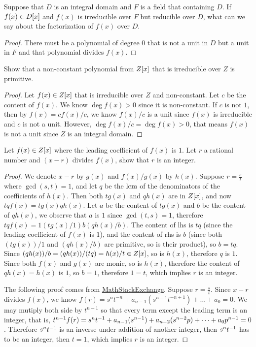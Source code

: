 \documentclass[../main.tex]{subfiles}
\begin{document}
\begin{exercise}
  Suppose that $D$ is an integral domain and $F$ is a field that containing $D$.
  If $f(x) \in D[x]$ and $f(x)$ is irreducible over $F$
  but reducible over $D$, what can we say about the factorization of $f(x)$ over $D$.
\end{exercise}
\begin{proof}
  There must be a polynomial of degree $0$ that is not a unit in $D$
  but a unit in $F$ and that polynomial divides $f(x)$.
\end{proof}

\setcounter{exercise}{2}
\begin{exercise}
  Show that a non-constant polynomial from $Z[x]$ that is irreducible
  over $Z$ is primitive.
\end{exercise}
\begin{proof}
  Let $f(x) \in Z[x]$ that is irreducible over $Z$ and non-constant.
  Let $c$ be the content of $f(x)$.
  We know $\deg f(x) > 0$ since it is non-constant.
  If $c$ is not $1$, then by $f(x) = cf(x)/c$, we know $f(x)/c$ is a unit
  since $f(x)$ is irreducible and $c$ is not a unit. 
  However, $\deg f(x)/c = \deg f(x) > 0$, that means $f(x)$ is not a unit
  since $Z$ is an integral domain.
\end{proof}

\begin{exercise}
  Let $f(x) \in Z[x]$ where the leading coefficient of $f(x)$ is $1$.
  Let $r$ a rational number and $(x - r)$ divides $f(x)$, 
  show that $r$ is an integer.
\end{exercise}
\begin{proof}
  We denote $x - r$ by $g(x)$ and $f(x)/g(x)$ by $h(x)$.
  Suppose $r = \frac{s}{t}$ where $\gcd(s, t) = 1$,
  and let $q$ be the $\operatorname{lcm}$ of the denominators of the coefficients of $h(x)$.
  Then both $tg(x)$ and $qh(x)$ are in $Z[x]$, and now $tqf(x) = tg(x)qh(x)$.
  Let $a$ be the content of $tg(x)$ and $b$ be the content of $qh(x)$,
  we observe that $a$ is $1$ since $\gcd(t, s) = 1$, therefore 
  $tqf(x) = 1(tg(x)/1) b(qh(x)/b)$.
  The content of lhs is $tq$ (since the leading coefficient of $f(x)$ is $1$),
  and the content of rhs is $b$ (since both $(tg(x))/1$ and $(qh(x)/b)$ are primitive,
  so is their product), so $b = tq$.
  Since $(qh(x))/b = (qh(x))/(tq) = h(x)/t \in Z[x]$, so is $h(x)$, therefore $q$ is $1$.
  Since both $f(x)$ and $g(x)$ are monic, so is $h(x)$, therefore the content of
  $qh(x) = h(x)$ is $1$, so $b = 1$, therefore $1 = t$, which implies $r$ is an integer.

  The following proof comes from \href{https://math.stackexchange.com/a/3330480}{MathStackExchange}.
  Suppose $r = \frac{s}{t}$.
  Since $x - r$ divides $f(x)$, we know $f(r) = s^nt^{-n} + a_{n - 1}(s^{n - 1}t^{- n + 1}) + \dots + a_0 = 0$.
  We may mutiply both side by $t^{n - 1}$ so that every term except the leading term
  is an integer, that is, $t^{n - 1}f(r) = s^nt^{-1} + a_{n - 1}(s^{n - 1}) + a_{n - 2}(s^{n - 2}p) + \dots + a_0p^{n - 1} = 0$.
  Therefore $s^nt^{-1}$ is an inverse under addition of another integer, 
  then $s^nt^{-1}$ has to be an integer, then $t = 1$, which implies $r$ is an integer.
\end{proof}
\end{document}
